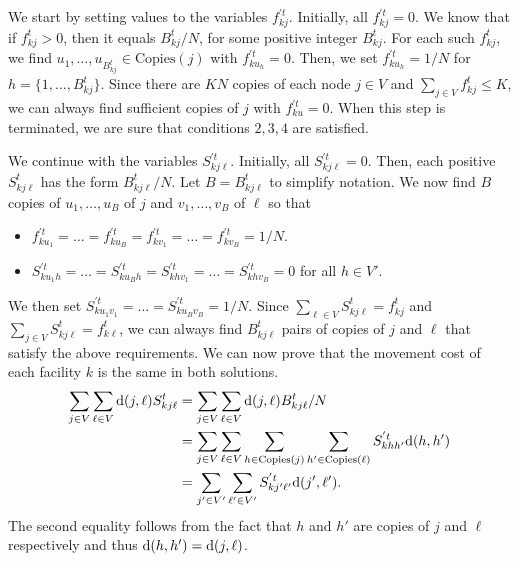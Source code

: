 \begin{proof2}
We start by setting values to the variables $f_{kj}^{'t}$.
Initially, all $f_{kj}^{'t} = 0$.
We know that if $f_{kj}^t>0$, then it equals $B_{kj}^t/N$,
for some positive integer $B_{kj}^t$. For each
such $f_{kj}^t$, we find $u_1,\ldots,
u_{B_{kj}^t} \in \text{Copies}(j)$ with $f_{ku_h}^{'t} = 0$. Then, we set 
$f_{k u_h}^{'t} = 1/N$ for $h = \{1, \ldots ,B_{kj}^t\}$. Since there are $KN$ copies of 
each node $j \in V$ and $\sum_{j \in V}f_{kj}^t \leq K$, we can always find 
sufficient copies of
$j$ with $f_{ku}^{'t} = 0$. When this step is terminated, we are sure that 
conditions $2,3,4$ are satisfied. 

We continue with the variables $S_{kj\ell}^{'t}$.
Initially, all $S_{kj\ell}^{'t} = 0$. Then, each positive
$S_{kj\ell}^{t}$ has the form $B_{kj\ell}^{t}/N$.
Let $B = B_{kj\ell}^{t}$ to simplify notation.
We now find $B$ copies of $u_1,\ldots, u_{B}$ of $j$ and $v_1,\ldots, v_B$ of 
$\ell$ so that

\begin{itemize}
    \item $f_{ku_1}^{' t} = \ldots = f_{ku_{B}}^{'t} = f_{kv_1}^{'t} = \ldots = 
    f_{kv_{B}}^{'t} = 1/N$.

 \item $S_{ku_1 h }^{'t} = \ldots = S_{k u_{B} h}^{'t} = S_{k h v_1 }^{'t} = \ldots = 
 S_{k h v_{B}}^{'t} = 0$
for all $h \in V'$.

\end{itemize}
We then set 
$S_{ku_1 v_1 }^{'t} = \ldots = S_{ku_B v_B }^{'t} = 1/N$. Since $\sum 
_{\ell \in V}S_{kj \ell }^{t} = f_{kj}^t$ and $\sum _{j \in V}S_{kj \ell }^{t} = 
f_{k\ell}^t$, we can always find $B_{kj\ell}^t$ pairs of copies of $j$ and $\ell$ that 
satisfy the above requirements. We can now prove that the movement cost
of each facility $k$ is the same in both solutions.
\begin{align*}
\sum_{j \in V}\sum_{\ell \in V}\mathrm{d}(j,\ell)S_{kj\ell}^t &=
\sum_{j \in V}\sum_{\ell \in V}\mathrm{d}(j,\ell)B_{kj\ell}^t/N\\
&=
\sum_{j \in V}\sum_{\ell \in V}\sum_{h \in \text{Copies}(j)}\sum_{ h' \in 
\text{Copies}(\ell)}S_{k h h'}^{'t}\mathrm{d}(h,h')\\
&=
\sum_{j' \in V'}\sum_{\ell' \in V'} S_{k j' \ell'}^{'t}\mathrm{d}(j',\ell').
\end{align*}
\noindent The second equality follows from the fact that $h$ and $h'$ are copies of 
$j$ and $\ell$ respectively and thus 
$\mathrm{d}(h,h')=\mathrm{d}(j,\ell)$.


\end{proof2}
